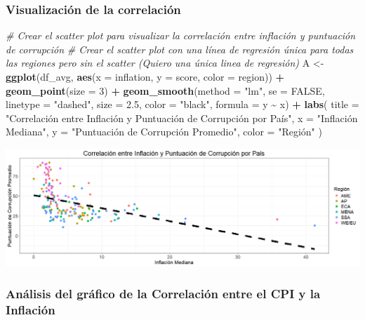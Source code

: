 \documentclass[
]{article}
\newenvironment{Shaded}{\begin{snugshade}}{\end{snugshade}}
\newcommand{\AttributeTok}[1]{\textcolor[rgb]{0.13,0.29,0.53}{#1}}
\newcommand{\CommentTok}[1]{\textcolor[rgb]{0.56,0.35,0.01}{\textit{#1}}}
\newcommand{\ConstantTok}[1]{\textcolor[rgb]{0.56,0.35,0.01}{#1}}
\newcommand{\DecValTok}[1]{\textcolor[rgb]{0.00,0.00,0.81}{#1}}
\newcommand{\FloatTok}[1]{\textcolor[rgb]{0.00,0.00,0.81}{#1}}
\newcommand{\FunctionTok}[1]{\textcolor[rgb]{0.13,0.29,0.53}{\textbf{#1}}}
\newcommand{\NormalTok}[1]{#1}
\newcommand{\OtherTok}[1]{\textcolor[rgb]{0.56,0.35,0.01}{#1}}
\newcommand{\SpecialCharTok}[1]{\textcolor[rgb]{0.81,0.36,0.00}{\textbf{#1}}}
\newcommand{\StringTok}[1]{\textcolor[rgb]{0.31,0.60,0.02}{#1}}
\begin{document}
\subsubsection{Visualización de la
correlación}\label{visualizacion-correlacion}

\begin{Shaded}
\begin{Highlighting}[]
\CommentTok{\# Crear el scatter plot para visualizar la correlación entre inflación y puntuación de corrupción}
\CommentTok{\# Crear el scatter plot con una línea de regresión única para todas las regiones pero sin el scatter (Quiero una única linea de regresión)}
\NormalTok{A }\OtherTok{\textless{}{-}} \FunctionTok{ggplot}\NormalTok{(df\_avg, }\FunctionTok{aes}\NormalTok{(}\AttributeTok{x =}\NormalTok{ inflation, }\AttributeTok{y =}\NormalTok{ score, }\AttributeTok{color =}\NormalTok{ region)) }\SpecialCharTok{+}
    \FunctionTok{geom\_point}\NormalTok{(}\AttributeTok{size =} \DecValTok{3}\NormalTok{) }\SpecialCharTok{+}
    \FunctionTok{geom\_smooth}\NormalTok{(}\AttributeTok{method =} \StringTok{"lm"}\NormalTok{, }\AttributeTok{se =} \ConstantTok{FALSE}\NormalTok{, }\AttributeTok{linetype =} \StringTok{"dashed"}\NormalTok{, }\AttributeTok{size =} \FloatTok{2.5}\NormalTok{, }\AttributeTok{color =} \StringTok{"black"}\NormalTok{, }\AttributeTok{formula =}\NormalTok{ y }\SpecialCharTok{\textasciitilde{}}\NormalTok{ x) }\SpecialCharTok{+}
    \FunctionTok{labs}\NormalTok{(}
        \AttributeTok{title =} \StringTok{"Correlación entre Inflación y Puntuación de Corrupción por País"}\NormalTok{,}
        \AttributeTok{x =} \StringTok{"Inflación Mediana"}\NormalTok{,}
        \AttributeTok{y =} \StringTok{"Puntuación de Corrupción Promedio"}\NormalTok{,}
        \AttributeTok{color =} \StringTok{"Región"}
\NormalTok{    )}
\end{Highlighting}
\end{Shaded}

\includegraphics{Correlacion_CPI_Inflacion.png}

\subsubsection{Análisis del gráfico de la Correlación entre el CPI y la
Inflación}\label{analisis-del-grafico-correlacion-cpi-inflacion}
\end{document}
